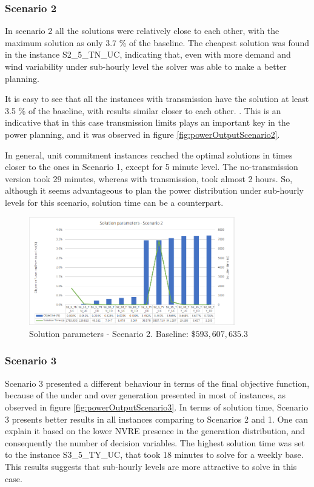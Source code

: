\documentclass[12pt,LUDisStyle,twosided]{book}
\begin{document}
\subsubsection{Scenario 2}

In scenario 2 all the solutions were relatively close to each other, with the maximum solution as only 3.7 \% of the baseline. The cheapest solution was found in the instance S2\_5\_TN\_UC, indicating that, even with more demand and wind variability under sub-hourly level the solver was able to make a better planning.

It is easy to see that all the instances with transmission have the solution at least 3.5 \% of the baseline, with results similar closer to each other. . This is an indicative that in this case transmission limits plays an important key in the power planning, and it was observed in figure \ref{fig:powerOutputScenario2}.

In general, unit commitment instances reached the optimal solutions in times closer to the ones in Scenario 1, except for 5 minute level. The no-transmission version took 29 minutes, whereas with transmission, took almost 2 hours. So, although it seems advantageous to plan the power distribution under sub-hourly levels for this scenario, solution time can be a counterpart.

\begin{figure}[H] 
  \centering  
	  \includegraphics[width=0.8\textwidth,height=\textheight,keepaspectratio]{SolutionParametersS2.png}  
  \caption{Solution parameters - Scenario 2. Baseline: $\$593,607,635.3$}
  \label{fig:solutionparameterss2}
\end{figure}

\subsubsection{Scenario 3}

Scenario 3 presented a different behaviour in terms of the final objective function, because of the under and over generation presented in most of instances, as observed in figure \ref{fig:powerOutputScenario3}. In terms of solution time, Scenario 3 presents better results in all instances comparing to Scenarios 2 and 1. One can explain it based on the lower NVRE presence in the generation distribution, and consequently the number of decision variables. The highest solution time was set to the instance S3\_5\_TY\_UC, that took 18 minutes to solve for a weekly base. This results suggests that sub-hourly levels are more attractive to solve in this case.
\end{document}
